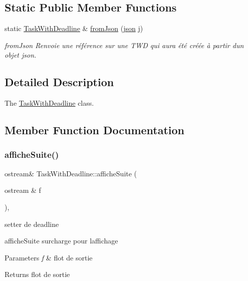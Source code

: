 \subsection*{Static Public Member Functions}
\begin{DoxyCompactItemize}
\item 
static \hyperlink{classTaskWithDeadline}{Task\+With\+Deadline} \& \hyperlink{classTaskWithDeadline_a170d73e040f305f255bb0ea6280fbfb8}{from\+Json} (\hyperlink{classnlohmann_1_1basic__json}{json} j)
\begin{DoxyCompactList}\small\item\em from\+Json Renvoie une référence sur une T\+WD qui aura été créée à partir d\textquotesingle{}un objet json. \end{DoxyCompactList}\end{DoxyCompactItemize}


\subsection{Detailed Description}
The \hyperlink{classTaskWithDeadline}{Task\+With\+Deadline} class. 

\subsection{Member Function Documentation}
\mbox{\label{classTaskWithDeadline_a594623304e3500104c071ebbb95d1670}} 
\subsubsection{\texorpdfstring{affiche\+Suite()}{afficheSuite()}}
{\footnotesize\ttfamily ostream\& Task\+With\+Deadline\+::affiche\+Suite (\begin{DoxyParamCaption}\item[{ostream \&}]{f }\end{DoxyParamCaption})\hspace{0.3cm}{\ttfamily [inline]}, {\ttfamily [virtual]}}



setter de deadline 

affiche\+Suite surcharge pour l\textquotesingle{}affichage 
\begin{DoxyParams}{Parameters}
{\em f} & flot de sortie \\
\hline
\end{DoxyParams}
\begin{DoxyReturn}{Returns}
flot de sortie 
\end{DoxyReturn}


